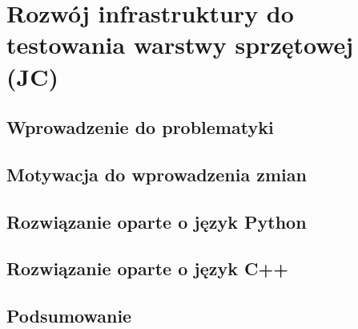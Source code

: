 \clearpage
\section{Rozwój infrastruktury do testowania warstwy sprzętowej (JC)}
\label{ch:hardware_testing}

\subsection{Wprowadzenie do problematyki}

\subsection{Motywacja do wprowadzenia zmian}

\subsection{Rozwiązanie oparte o język Python}

\subsection{Rozwiązanie oparte o język C++}

\subsection{Podsumowanie}